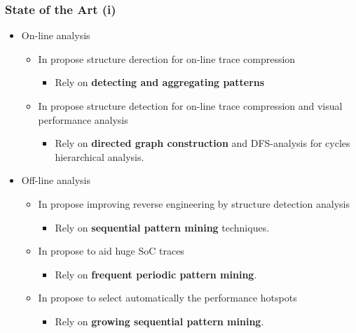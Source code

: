 \documentclass{beamer}
\begin{document}
\begin{frame}
\frametitle{State of the Art (i)}
\begin{itemize}
	\item On-line analysis
	\begin{itemize}
		\item In \cite{noeth2009scalatrace} propose structure derection for on-line trace compression
		\begin{itemize}
			\item Rely on \textbf{detecting and aggregating patterns}
		\end{itemize}
		\item In \cite{aguilar2016event} propose structure detection for on-line trace compression and visual performance analysis
		\begin{itemize}
			\item Rely on \textbf{directed graph construction} and DFS-analysis for cycles hierarchical analysis.
		\end{itemize}
	\end{itemize}
	\item Off-line analysis
	\begin{itemize}
		\item In \cite{Safyallah2006} propose improving reverse engineering by structure detection analysis
		\begin{itemize}
			\item Rely on \textbf{sequential pattern mining} techniques.
		\end{itemize}
		\item In \cite{Lopez-Cueva2012} propose to aid huge SoC traces
		\begin{itemize}
			\item Rely on \textbf{frequent periodic pattern mining}.
		\end{itemize}
		\item In \cite{trahay2015selecting} propose to select automatically the performance hotspots
		\begin{itemize}
			\item Rely on \textbf{growing sequential pattern mining}.
		\end{itemize}
	\end{itemize}
\end{itemize}
\end{frame}
\end{document}
